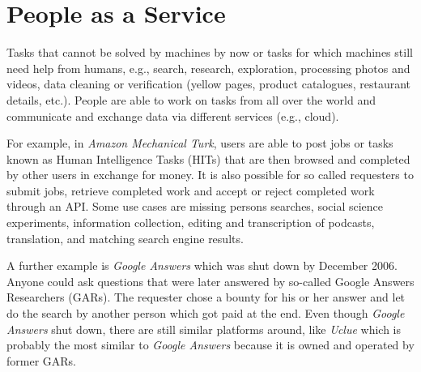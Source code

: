\documentclass[a4paper]{article}
\begin{document}
\section{People as a Service}
Tasks that cannot be solved by machines by now or tasks for which machines still need help from humans,
e.g., search, research, exploration, processing photos and videos, data cleaning or verification (yellow pages, product catalogues, restaurant details, etc.).
People are able to work on tasks from all over the world and communicate and exchange data via different services (e.g., cloud).

For example, in \emph{Amazon Mechanical Turk}, users are able to post jobs or tasks known as Human Intelligence Tasks (HITs) that are then browsed and completed by other users in exchange for money.
It is also possible for so called requesters to submit jobs, retrieve completed work and accept or reject completed work through an API. 
Some use cases are missing persons searches, social science experiments, information collection, editing and transcription of podcasts, translation, and matching search engine results.

A further example is \emph{Google Answers} which was shut down by December 2006. Anyone could ask questions that were later answered by so-called Google Answers Researchers (GARs).
The requester chose a bounty for his or her answer and let do the search by another person which got paid at the end.
Even though \emph{Google Answers} shut down, there are still similar platforms around, like \emph{Uclue} which is probably the most similar to \emph{Google Answers} because it is owned and operated by former GARs. 
\end{document}
